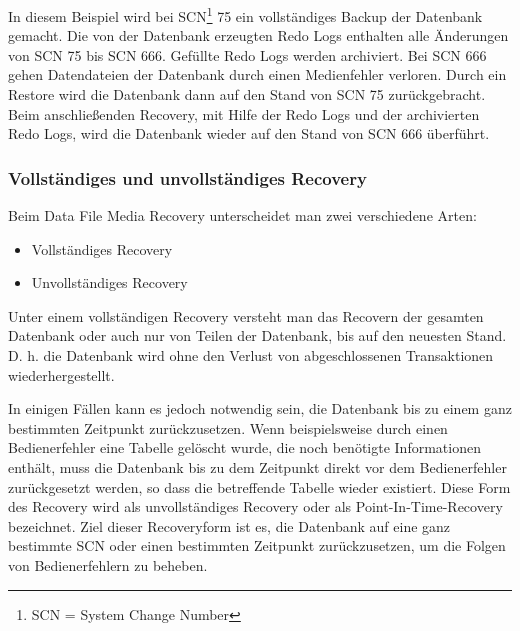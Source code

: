 
          In diesem Beispiel wird bei SCN\footnote{SCN = System Change Number} 75 ein vollst\"andiges Backup der Datenbank gemacht. Die von der Datenbank erzeugten Redo Logs enthalten alle \"Anderungen von SCN 75 bis SCN 666. Gef\"ullte Redo Logs werden archiviert. Bei SCN 666 gehen Datendateien der Datenbank durch einen Medienfehler verloren. Durch ein Restore wird die Datenbank dann auf den Stand von SCN 75 zur\"uckgebracht. Beim anschlie\ss{}enden Recovery, mit Hilfe der Redo Logs und der archivierten Redo Logs, wird die Datenbank wieder auf den Stand von SCN 666 \"uberf\"uhrt.
        \subsubsection{Vollst\"andiges und unvollst\"andiges Recovery}
          Beim Data File Media Recovery unterscheidet man zwei verschiedene Arten:
          \begin{itemize}
            \item Vollst\"andiges Recovery
            \item Unvollst\"andiges Recovery
          \end{itemize}
          \begin{merke}
            Unter einem vollst\"andigen Recovery versteht man das Recovern der gesamten Datenbank oder auch nur von Teilen der Datenbank, bis auf den neuesten Stand. D. h. die Datenbank wird ohne den Verlust von abgeschlossenen Transaktionen wiederhergestellt.
          \end{merke}

          In einigen F\"allen kann es jedoch notwendig sein, die Datenbank bis
          zu einem ganz bestimmten Zeitpunkt zur\"uckzusetzen. Wenn
          beispielsweise durch einen Bedienerfehler eine Tabelle gel\"oscht
          wurde, die noch ben\"otigte Informationen enth\"alt, muss die
          Datenbank bis zu dem Zeitpunkt direkt vor dem Bedienerfehler
          zur\"uckgesetzt werden, so dass die betreffende Tabelle wieder
          existiert.
\clearpage
          Diese Form des Recovery wird als unvollst\"andiges Recovery
          oder als Point-In-Time-Recovery bezeichnet. Ziel dieser Recoveryform
          ist es, die Datenbank auf eine ganz bestimmte SCN oder einen
          bestimmten Zeitpunkt zur\"uckzusetzen, um die Folgen von
          Bedienerfehlern zu beheben.

